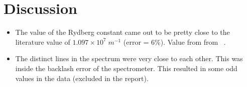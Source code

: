 \section{Discussion}
\begin{itemize}
\item The value of the Rydberg constant came out to be pretty close to the literature value of $1.097\times 10^{7}\;m^{-1}$ (error = 6\%). Value from from ~\cite{manual}.
\item The distinct lines in the spectrum were very close to each other. This was inside the backlash error of the spectrometer. This resulted in some odd values in the data (excluded in the report). 
\end{itemize}